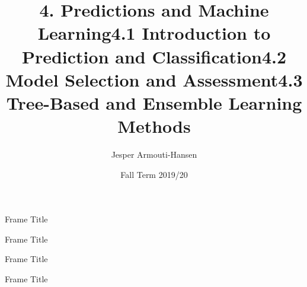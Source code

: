 \documentclass{beamer}
\title{4. Predictions and Machine Learning}
\author{Jesper Armouti-Hansen}
\date{Fall Term 2019/20}
\begin{document}
\begin{frame}[plain]
    \maketitle
\end{frame}

\begin{frame}{Frame Title}
\end{frame}



\title{4.1 Introduction to Prediction and Classification}
\author{}
\date{}
\begin{frame}[plain]
	\maketitle
\end{frame}

\begin{frame}{Frame Title}
\end{frame}



\title{4.2 Model Selection and Assessment}
\date{}
\begin{frame}[plain]
\maketitle
\end{frame}

\begin{frame}{Frame Title}
\end{frame}



\title{4.3 Tree-Based and Ensemble Learning Methods}
\date{}
\begin{frame}[plain]
\maketitle
\end{frame}

\begin{frame}{Frame Title}
\end{frame}
\end{document}
